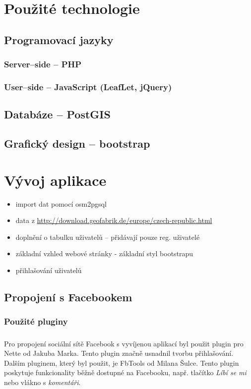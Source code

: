 \documentclass[11pt,a4paper,titlepage,oneside]{book}
\begin{document}
\chapter{Použité technologie}
	\section{Programovací jazyky}
		\subsection{Server--side -- PHP}
			
		\subsection{User--side -- JavaScript (LeafLet, jQuery)}
	\section{Databáze -- PostGIS}
	\section{Grafický design -- bootstrap \cite{bootstrap}}

\chapter{Vývoj aplikace}
		\begin{itemize}
			\item import dat pomocí osm2pgsql
			\item data z \url{http://download.geofabrik.de/europe/czech-republic.html}
			\item doplnění o tabulku uživatelů -- přidávají pouze reg. uživatelé
			\item základní vzhled webové stránky - základní styl bootstrapu
			\item přihlašování uživatelů
		\end{itemize}

		\section{Propojení s Facebookem}
			\subsection{Použité pluginy}
				\paragraph{} Pro propojení sociální sítě Facebook s vyvíjenou aplikací byl použit plugin pro Nette\cite{nette20login} od Jakuba Marka. Tento plugin značně usnadnil tvorbu přihlašování. Dalším pluginem, který byl použit, je FbTools\cite{FbTools} od Milana Šulce. Tento plugin poskytuje funkcionality běžně dostupné na Facebooku, např. tlačítko \textit{Líbí se mi} nebo vlákno s \textit{komentáři}.
\end{document}
